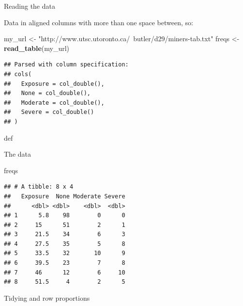 \documentclass[ignorenonframetext,]{beamer}
\newenvironment{Shaded}{\begin{snugshade}}{\end{snugshade}}
\newcommand{\DataTypeTok}[1]{\textcolor[rgb]{0.13,0.29,0.53}{#1}}
\newcommand{\KeywordTok}[1]{\textcolor[rgb]{0.13,0.29,0.53}{\textbf{#1}}}
\newcommand{\NormalTok}[1]{#1}
\newcommand{\OperatorTok}[1]{\textcolor[rgb]{0.81,0.36,0.00}{\textbf{#1}}}
\newcommand{\StringTok}[1]{\textcolor[rgb]{0.31,0.60,0.02}{#1}}
\begin{document}
\begin{frame}[fragile]{Reading the data}
\protect\hypertarget{reading-the-data}{}

Data in aligned columns with more than one space between, so:

\begin{Shaded}
\begin{Highlighting}[]
\NormalTok{my_url <-}\StringTok{ "http://www.utsc.utoronto.ca/~butler/d29/miners-tab.txt"}
\NormalTok{freqs <-}\StringTok{ }\KeywordTok{read_table}\NormalTok{(my_url)}
\end{Highlighting}
\end{Shaded}

\begin{verbatim}
## Parsed with column specification:
## cols(
##   Exposure = col_double(),
##   None = col_double(),
##   Moderate = col_double(),
##   Severe = col_double()
## )
\end{verbatim}

def

\end{frame}

\begin{frame}[fragile]{The data}
\protect\hypertarget{the-data-3}{}

\begin{Shaded}
\begin{Highlighting}[]
\NormalTok{freqs}
\end{Highlighting}
\end{Shaded}

\begin{verbatim}
## # A tibble: 8 x 4
##   Exposure  None Moderate Severe
##      <dbl> <dbl>    <dbl>  <dbl>
## 1      5.8    98        0      0
## 2     15      51        2      1
## 3     21.5    34        6      3
## 4     27.5    35        5      8
## 5     33.5    32       10      9
## 6     39.5    23        7      8
## 7     46      12        6     10
## 8     51.5     4        2      5
\end{verbatim}

\end{frame}

\begin{frame}[fragile]{Tidying and row proportions}
\protect\hypertarget{tidying-and-row-proportions}{}

\begin{Shaded}
\end{Shaded}

\end{frame}
\end{document}
